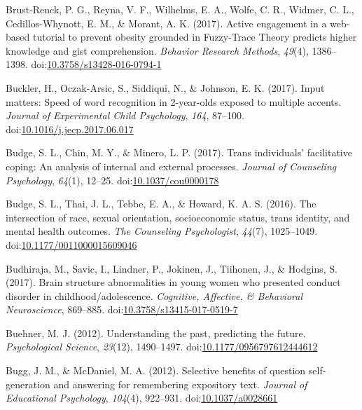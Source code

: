 \documentclass[english,man]{apa6}
\begin{document}
\hypertarget{ref-Brust-Renck2016}{}
Brust-Renck, P. G., Reyna, V. F., Wilhelms, E. A., Wolfe, C. R., Widmer,
C. L., Cedillos-Whynott, E. M., \& Morant, A. K. (2017). Active
engagement in a web-based tutorial to prevent obesity grounded in
Fuzzy-Trace Theory predicts higher knowledge and gist comprehension.
\emph{Behavior Research Methods}, \emph{49}(4), 1386--1398.
doi:\href{https://doi.org/10.3758/s13428-016-0794-1}{10.3758/s13428-016-0794-1}

\hypertarget{ref-Buckler2017}{}
Buckler, H., Oczak-Arsic, S., Siddiqui, N., \& Johnson, E. K. (2017).
Input matters: Speed of word recognition in 2-year-olds exposed to
multiple accents. \emph{Journal of Experimental Child Psychology},
\emph{164}, 87--100.
doi:\href{https://doi.org/10.1016/j.jecp.2017.06.017}{10.1016/j.jecp.2017.06.017}

\hypertarget{ref-Budge2017}{}
Budge, S. L., Chin, M. Y., \& Minero, L. P. (2017). Trans individuals'
facilitative coping: An analysis of internal and external processes.
\emph{Journal of Counseling Psychology}, \emph{64}(1), 12--25.
doi:\href{https://doi.org/10.1037/cou0000178}{10.1037/cou0000178}

\hypertarget{ref-Budge2016}{}
Budge, S. L., Thai, J. L., Tebbe, E. A., \& Howard, K. A. S. (2016). The
intersection of race, sexual orientation, socioeconomic status, trans
identity, and mental health outcomes. \emph{The Counseling
Psychologist}, \emph{44}(7), 1025--1049.
doi:\href{https://doi.org/10.1177/0011000015609046}{10.1177/0011000015609046}

\hypertarget{ref-Budhiraja2017}{}
Budhiraja, M., Savic, I., Lindner, P., Jokinen, J., Tiihonen, J., \&
Hodgins, S. (2017). Brain structure abnormalities in young women who
presented conduct disorder in childhood/adolescence. \emph{Cognitive,
Affective, \& Behavioral Neuroscience}, 869--885.
doi:\href{https://doi.org/10.3758/s13415-017-0519-7}{10.3758/s13415-017-0519-7}

\hypertarget{ref-Buehner2012}{}
Buehner, M. J. (2012). Understanding the past, predicting the future.
\emph{Psychological Science}, \emph{23}(12), 1490--1497.
doi:\href{https://doi.org/10.1177/0956797612444612}{10.1177/0956797612444612}

\hypertarget{ref-Bugg2012}{}
Bugg, J. M., \& McDaniel, M. A. (2012). Selective benefits of question
self-generation and answering for remembering expository text.
\emph{Journal of Educational Psychology}, \emph{104}(4), 922--931.
doi:\href{https://doi.org/10.1037/a0028661}{10.1037/a0028661}
\end{document}
